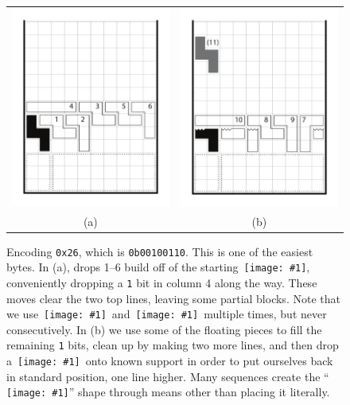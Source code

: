 \documentclass[twocolumn]{article}
\newcommand\tetrispiece[1]{\,\texttt{[image: \#1]}\hspace{0.1em}}
\newcommand\zhoriz{\tetrispiece{z_horiz}}
\newcommand\svert{\tetrispiece{s_vert}}
\newcommand\ldown{\tetrispiece{l_down}}
\begin{document}
\begin{figure}
  \centering
  \begin{tabular}{cc}
  \includegraphics[width=0.4 \linewidth]{encode26a} &
  \includegraphics[width=0.4 \linewidth]{encode26b} \\
  (a) & (b)
  \end{tabular}
  \caption{ Encoding {\tt 0x26}, which is {\tt 0b00100110}. This is one
    of the easiest bytes. In (a), drops 1--6 build off of the starting
    \svert, conveniently dropping a {\tt 1} bit in column 4 along the
    way. These moves clear the two top lines, leaving some partial
    blocks. Note that we use \zhoriz\ and \ldown\ multiple times, but
    never consecutively. In (b) we use some of the floating pieces to
    fill the remaining {\tt 1} bits, clean up by making two more
    lines, and then drop a \svert\ onto known support in order to put
    ourselves back in standard position, one line higher. Many
    sequences create the ``\svert'' shape through means other than
    placing it literally. } \label{fig:encode26}
\end{figure}
\end{document}
